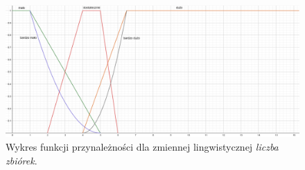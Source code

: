 \documentclass{classrep}
\begin{document}
\begin{enumerate}
    \begin{figure}[H]
        \centering
        \includegraphics[width=14cm]{wykres_zbiorki.png}
        \caption{Wykres funkcji przynależności dla zmiennej lingwistycznej \textit{liczba zbiórek}.}
        \label{rysunek:zbiorki}
    \end{figure}
    

\end{enumerate}
\end{document}
